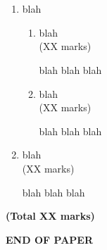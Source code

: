 \documentclass[12pt, a4paper]{exam}
\begin{document}
\section{}
\begin{enumerate}
\item blah\\

    \begin{enumerate}[label=\roman*.]

    \item blah\\
    \hspace*{\fill} (XX marks)
    \begin{solution}blah blah blah\end{solution}

    \item blah\\
    \hspace*{\fill} (XX marks)
    \begin{solution}blah blah blah\end{solution}

    \end{enumerate}

\item blah\\
    \hspace*{\fill} (XX marks)
    \begin{solution}blah blah blah\end{solution}

\end{enumerate}
\hspace*{\fill} {\bf{(Total XX marks)}}



\vspace*{2.5cm}
\centerline{{\bf{END OF PAPER}}}
\end{document}
